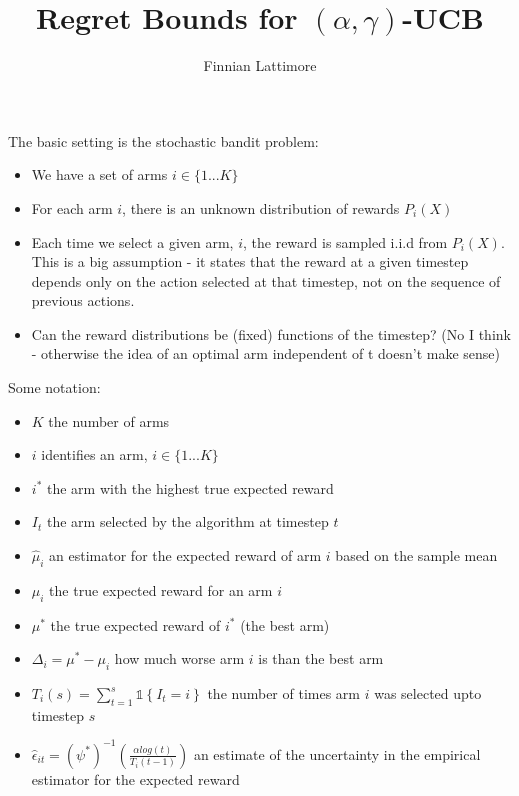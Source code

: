 \documentclass{article}
\title{Regret Bounds for $(\alpha,\gamma)$-UCB}
\author{Finnian Lattimore}
\newcommand{\set}[1]{\left\{#1\right\}}
\newcommand{\ind}[1]{\mathds{1}\!\!\set{#1}}
\theoremstyle{plain}
\theoremstyle{definition}
\begin{document}
\def\ci{\perp\!\!\!\perp}
\maketitle

The basic setting is the stochastic bandit problem: 

\begin{itemize}
\item We have a set of arms $i \in \{1...K\}$
\item For each arm $i$, there is an unknown distribution of rewards $P_{i}(X)$
\item Each time we select a given arm, $i$, the reward is sampled i.i.d from $P_{i}(X)$. This is a big assumption - it states that the reward at a given timestep depends only on the action selected at that timestep, not on the sequence of previous actions. 
\item \color{red}Can the reward distributions be (fixed) functions of the timestep? (No I think - otherwise the idea of an optimal arm independent of t doesn't make sense)
\end{itemize}

Some notation:

\begin{itemize}
\item $K$ the number of arms
\item $i$ identifies an arm, $i \in \{1...K\}$
\item $i^*$ the arm with the highest true expected reward
\item $I_t$ the arm selected by the algorithm at timestep $t$
\item $\hat{\mu}_i$ an estimator for the expected reward of arm $i$ based on the sample mean
\item $\mu_i$ the true expected reward for an arm $i$
\item $\mu^*$ the true expected reward of  $i^*$ (the best arm)
\item $\Delta_i = \mu^* - \mu_i$ how much worse arm $i$ is than the best arm
\item $T_i(s) = \sum_{t=1}^s \ind{I_t = i}$ the number of times arm $i$ was selected upto timestep $s$
\item $\hat \epsilon_{it} =  (\psi^*)^{-1} \left(\frac{\alpha log(t)}{T_{i}(t-1)}\right)$ an estimate of the uncertainty in the empirical estimator for the expected reward


\end{itemize}
\end{document}
